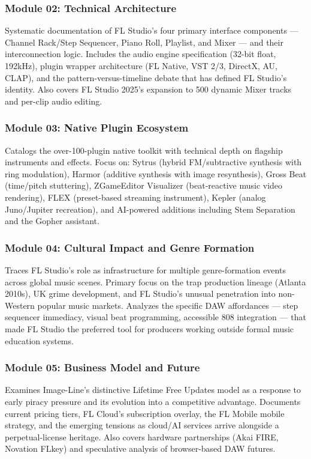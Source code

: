 \documentclass[11pt,letterpaper]{article}
\begin{document}
\subsubsection{Module 02: Technical Architecture}
Systematic documentation of FL Studio's four primary interface components --- Channel Rack/Step Sequencer, Piano Roll, Playlist, and Mixer --- and their interconnection logic. Includes the audio engine specification (32-bit float, 192kHz), plugin wrapper architecture (FL Native, VST 2/3, DirectX, AU, CLAP), and the pattern-versus-timeline debate that has defined FL Studio's identity. Also covers FL Studio 2025's expansion to 500 dynamic Mixer tracks and per-clip audio editing.

\subsubsection{Module 03: Native Plugin Ecosystem}
Catalogs the over-100-plugin native toolkit with technical depth on flagship instruments and effects. Focus on: Sytrus (hybrid FM/subtractive synthesis with ring modulation), Harmor (additive synthesis with image resynthesis), Gross Beat (time/pitch stuttering), ZGameEditor Visualizer (beat-reactive music video rendering), FLEX (preset-based streaming instrument), Kepler (analog Juno/Jupiter recreation), and AI-powered additions including Stem Separation and the Gopher assistant.

\subsubsection{Module 04: Cultural Impact and Genre Formation}
Traces FL Studio's role as infrastructure for multiple genre-formation events across global music scenes. Primary focus on the trap production lineage (Atlanta 2010s), UK grime development, and FL Studio's unusual penetration into non-Western popular music markets. Analyzes the specific DAW affordances --- step sequencer immediacy, visual beat programming, accessible 808 integration --- that made FL Studio the preferred tool for producers working outside formal music education systems.

\subsubsection{Module 05: Business Model and Future}
Examines Image-Line's distinctive Lifetime Free Updates model as a response to early piracy pressure and its evolution into a competitive advantage. Documents current pricing tiers, FL Cloud's subscription overlay, the FL Mobile mobile strategy, and the emerging tensions as cloud/AI services arrive alongside a perpetual-license heritage. Also covers hardware partnerships (Akai FIRE, Novation FLkey) and speculative analysis of browser-based DAW futures.
\end{document}

